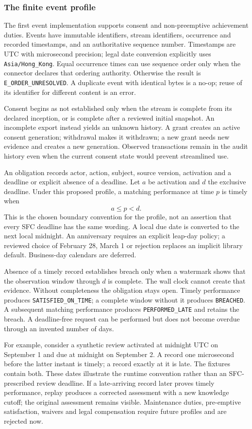 \subsubsection{The finite event profile}

The first event implementation supports consent and non-preemptive achievement
duties. Events have immutable identifiers, stream identifiers, occurrence and
recorded timestamps, and an authoritative sequence number. Timestamps are UTC
with microsecond precision; legal date conversion explicitly uses
\texttt{Asia/Hong\_Kong}. Equal occurrence times can use sequence order only
when the connector declares that ordering authority. Otherwise the result is
\texttt{E\_ORDER\_UNRESOLVED}. A duplicate event with identical bytes is a
no-op; reuse of its identifier for different content is an error.

Consent begins as not established only when the stream is complete from its
declared inception, or is complete after a reviewed initial snapshot. An incomplete export
instead yields an unknown history. A grant creates an active consent generation;
withdrawal makes it withdrawn; a new grant needs new evidence and creates a new
generation. Observed transactions remain in the audit history even when the
current consent state would prevent streamlined use.

An obligation records actor, action, subject, source version, activation and a
deadline or explicit absence of a deadline. Let $a$ be activation and $d$ the
exclusive deadline. Under this proposed profile, a matching performance at time
$p$ is timely when
\begin{equation}
 a\leq p<d.
 \label{eq:timely}
\end{equation}
This is the chosen boundary convention for the profile, not an assertion that
every SFC deadline has the same wording. A local due date is converted to the
next local midnight. An anniversary requires an explicit leap-day policy; a
reviewed choice of February 28, March 1 or rejection replaces an implicit library
default. Business-day calendars are deferred.

Absence of a timely record establishes breach only when a watermark shows that
the observation window through $d$ is complete. The wall clock cannot create
that evidence. Without completeness the obligation stays open. Timely performance
produces \texttt{SATISFIED\_ON\_TIME}; a complete window without it produces
\texttt{BREACHED}. A subsequent matching performance produces
\texttt{PERFORMED\_LATE} and retains the breach. A deadline-free request can be
performed but does not become overdue through an invented number of days.

For example, consider a synthetic review activated at midnight UTC on September
1 and due at midnight on September 2. A record one microsecond before the latter
instant is timely; a record exactly at it is late. The fixtures contain both.
These dates illustrate the runtime convention rather than an SFC-prescribed
review deadline. If a late-arriving record later proves timely performance,
replay produces a corrected assessment with a new knowledge cutoff; the original
assessment remains visible. Maintenance duties, pre-emptive satisfaction,
waivers and legal compensation require future profiles and are rejected now.
